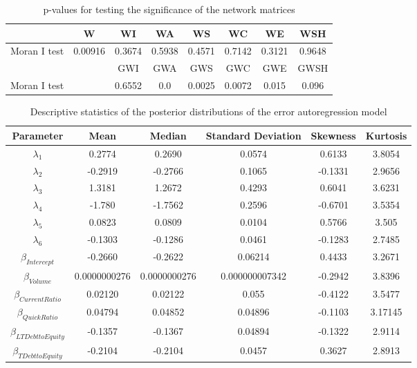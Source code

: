 \documentclass[times, doublespace]{auth}
\begin{document}
\begin{table}
	\centering
	\caption{p-values for testing the significance of the network matrices}
	\label{table3}
	\begin{tabular}{|c|c|c|c|c|c|c|c|}
		\hline
		 & W & WI & WA & WS & WC & WE & WSH\\
		\hline
		Moran I test & 0.00916 & 0.3674 & 0.5938 & 0.4571 & 0.7142 & 0.3121 & 0.9648\\
		\hline
		\hline
		 &  & GWI & GWA & GWS & GWC & GWE & GWSH\\
		\hline
		Moran I test &  & 0.6552 & 0.0 & 0.0025 & 0.0072 & 0.015 & 0.096\\
		\hline
	\end{tabular}
\end{table}

\begin{table}
	\small
	\centering
	\caption{Descriptive statistics of the posterior distributions of the error autoregression model}
	\label{table4}
	\begin{tabular}{|c|c|c|c|c|c|}
		\hline
		Parameter & Mean & Median & Standard Deviation & Skewness & Kurtosis\\
		\hline
		$\lambda_{1}$ & 0.2774 & 0.2690 & 0.0574 & 0.6133 & 3.8054\\
		\hline
		$\lambda_{2}$ & -0.2919 & -0.2766 & 0.1065 & -0.1331 & 2.9656\\
		\hline
		$\lambda_{3}$ & 1.3181 & 1.2672 & 0.4293 & 0.6041 & 3.6231\\
		\hline
		$\lambda_{4}$ & -1.780 & -1.7562 & 0.2596 & -0.6701 & 3.5354\\
		\hline
		$\lambda_{5}$ & 0.0823 & 0.0809 & 0.0104 & 0.5766 & 3.505\\
		\hline
		$\lambda_{6}$ & -0.1303 & -0.1286 & 0.0461 & -0.1283 & 2.7485\\
		\hline
		$\beta_{Intercept}$ & -0.2660 & -0.2622 & 0.06214 & 0.4433 & 3.2671\\
		\hline
		$\beta_{Volume}$ & 0.0000000276 & 0.0000000276 & 0.000000007342 & -0.2942 & 3.8396\\
		\hline
		$\beta_{Current Ratio}$ & 0.02120 & 0.02122 & 0.055 & -0.4122 & 3.5477\\
		\hline
		$\beta_{Quick Ratio}$ & 0.04794 & 0.04852 & 0.04896 & -0.1103 & 3.17145\\
		\hline
		$\beta_{LTDebt to Equity}$ & -0.1357 & -0.1367 & 0.04894 & -0.1322 & 2.9114\\
		\hline
		$\beta_{TDebt to Equity}$ & -0.2104 & -0.2104 & 0.0457 & 0.3627 & 2.8913\\

\end{tabular}
\end{table}
\end{document}
